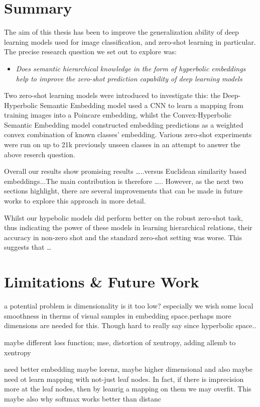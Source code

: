 \documentclass[12pt]{report}
\begin{document}
\section{Summary}
The aim of this thesis has been to improve the generalization ability of deep learning models used for image classification, and zero-shot learning in particular. The precise research question we set out to explore was: 
\begin{itemize}
\item \textit{Does semantic hierarchical knowledge in the form of hyperbolic embeddings help to improve the zero-shot prediction capability of deep learning models}
\end{itemize}
Two zero-shot learning models were introduced to investigate this: the Deep-Hyperbolic Semantic Embedding model used a CNN to learn a mapping from training images into a Poincare embedding, whilst the Convex-Hyperbolic Semantic Embedding model constructed embedding predictions as a weighted convex combination of known classes' embedding. Various zero-shot experiments were run on up to 21k previously unseen classes in an attempt to answer the above reserch question.

Overall our results show promising results \dots..versus Euclidean similarity based embeddings...The main contribution is therefore \dots.. However, as the next two sections highlight, there are several improvements that can be made in future works to explore this approach in more detail.

Whilst our hypebolic models did perform better on the robust zero-shot task, thus indicating the power of these models in learning hierarchical relations, their accuracy in non-zero shot and the standard zero-shot setting was worse. This suggests that \dots 

\section{Limitations \& Future Work}


a potential problem is dimensionality is it too low? especially we wish some local smoothness in therms of visual samples in embedding space.perhaps more dimensions are needed for this. Though hard to really say since hyperbolic space..

maybe different loss function; mse, distortion of xentropy, adding allemb to xentropy

need better embedding maybe lorenz, maybe higher dimensional and also maybe need ot learn mapping with not-just leaf nodes. In fact, if there is imprecision more at the leaf nodes, then by leanrig a mapping on them we may overfit. This maybe also why softmax works better than distanc
\end{document}
